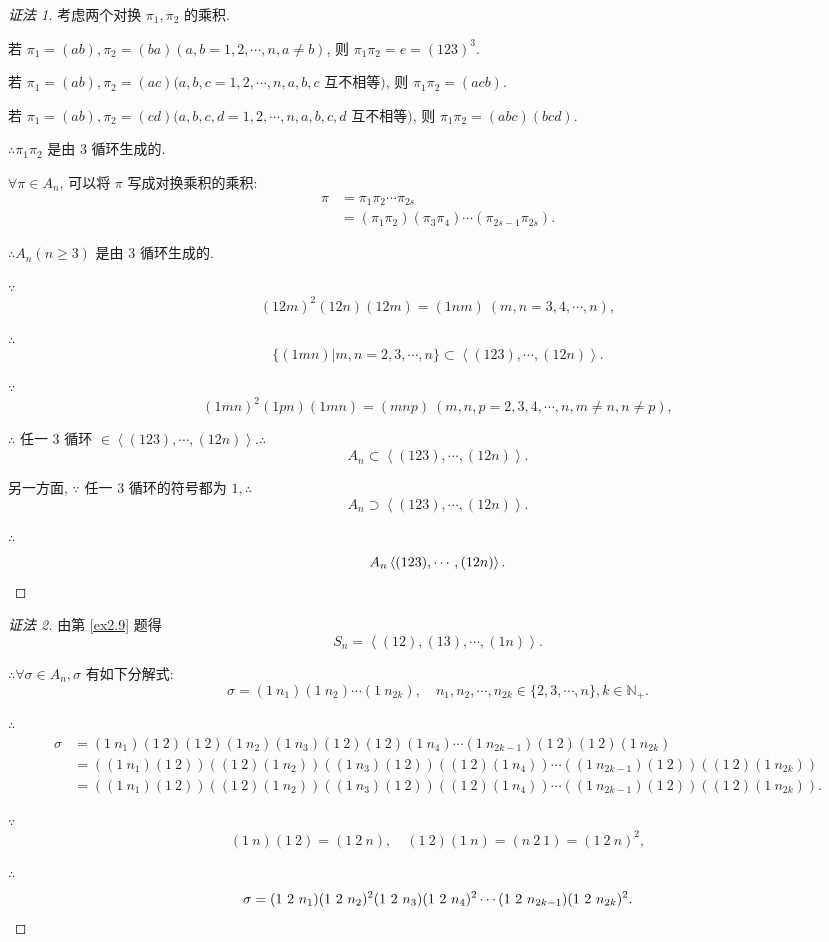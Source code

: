 \documentclass{ctexart}
\begin{document}
\begin{proof}[证法 1]
    考虑两个对换 $\pi_1,\pi_2$ 的乘积.

    若 $\pi_1=(ab),\pi_2=(ba)(a,b=1,2,\cdots,n,a\neq b)$, 则 $\pi_1\pi_2=e=(123)^3$.

    若 $\pi_1=(ab),\pi_2=(ac)(a,b,c=1,2,\cdots,n,a,b,c$ 互不相等$)$, 则 $\pi_1\pi_2=(acb)$.

    若 $\pi_1=(ab),\pi_2=(cd)(a,b,c,d=1,2,\cdots,n,a,b,c,d$ 互不相等$)$, 则 $\pi_1\pi_2=(abc)(bcd)$.

    $\therefore\pi_1\pi_2$ 是由 $3$ 循环生成的.

    $\forall\pi\in A_n$, 可以将 $\pi$ 写成对换乘积的乘积:
    \begin{align*}
        \pi & =\pi_1\pi_2\cdots\pi_{2s} \\
        & =(\pi_1\pi_2)(\pi_3\pi_4)\cdots(\pi_{2s-1}\pi_{2s}).
    \end{align*}

    $\therefore A_n(n\geq3)$ 是由 $3$ 循环生成的.

    $\because$
    \[(12m)^2(12n)(12m)=(1nm)\ (m,n=3,4,\cdots,n),\]

    $\therefore$
    \[\{(1mn)|m,n=2,3,\cdots,n\}\subset\left<(123),\cdots,(12n)\right>.\]

    $\because$
    \[(1mn)^2(1pn)(1mn)=(mnp)\ (m,n,p=2,3,4,\cdots,n,m\neq n,n\neq p),\]

    $\therefore$ 任一 $3$ 循环 $\in\left<(123),\cdots,(12n)\right>.\therefore$
    \[A_n\subset\left<(123),\cdots,(12n)\right>.\]

    另一方面, $\because$ 任一 $3$ 循环的符号都为 $1,\therefore$
    \[A_n\supset\left<(123),\cdots,(12n)\right>.\]

    $\therefore$
    \[A_n\left<(123),\cdots,(12n)\right>.\qedhere\]
\end{proof}
\begin{proof}[证法 2]
    由第 \ref{ex2.9} 题得
    \[S_n=\left<(12),(13),\cdots,(1n)\right>.\]

    $\therefore\forall\sigma\in A_n,\sigma$ 有如下分解式:
    \[\sigma=(1\ n_1)(1\ n_2)\cdots(1\ n_{2k}),\quad n_1,n_2,\cdots,n_{2k}\in\{2,3,\cdots,n\},k\in\mathbb{N}_+.\]

    $\therefore$
    \begin{align*}
        \sigma & =(1\ n_1)(1\ 2)(1\ 2)(1\ n_2)(1\ n_3)(1\ 2)(1\ 2)(1\ n_4)\cdots(1\ n_{2k-1})(1\ 2)(1\ 2)(1\ n_{2k}) \\
        & =((1\ n_1)(1\ 2))((1\ 2)(1\ n_2))((1\ n_3)(1\ 2))((1\ 2)(1\ n_4))\cdots((1\ n_{2k-1})(1\ 2))((1\ 2)(1\ n_{2k})) \\
        & =((1\ n_1)(1\ 2))((1\ 2)(1\ n_2))((1\ n_3)(1\ 2))((1\ 2)(1\ n_4))\cdots((1\ n_{2k-1})(1\ 2))((1\ 2)(1\ n_{2k})).
    \end{align*}

    $\because$
    \[(1\ n)(1\ 2)=(1\ 2\ n),\quad(1\ 2)(1\ n)=(n\ 2\ 1)=(1\ 2\ n)^2,\]

    $\therefore$
    \[\sigma=(1\ 2\ n_1)(1\ 2\ n_2)^2(1\ 2\ n_3)(1\ 2\ n_4)^2\cdots(1\ 2\ n_{2k-1})(1\ 2\ n_{2k})^2.\qedhere\]
\end{proof}
\end{document}
